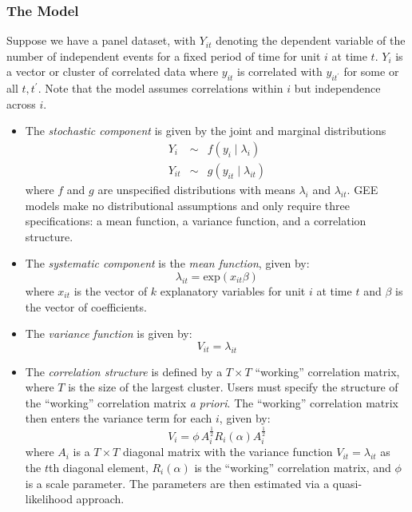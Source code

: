 \subsubsection{The Model}
Suppose we have a panel dataset, with $Y_{it}$ denoting the dependent variable of the number of independent events for a fixed period of time for unit $i$ at time $t$.  $Y_{i}$ is a vector or cluster of correlated data
where $y_{it}$ is correlated with $y_{it^\prime}$ for some or all
$t, t^\prime$.  Note that the model assumes correlations within $i$ but independence across $i$.  

\begin{itemize}

\item The \emph{stochastic component} is given by the joint and marginal distributions
\begin{eqnarray*}
Y_{i} &\sim& f(y_{i} \mid \lambda_{i})\\
Y_{it} &\sim& g(y_{it} \mid \lambda_{it})
\end{eqnarray*}
where $f$ and $g$ are unspecified distributions with means $\lambda_{i}$ and $\lambda_{it}$.  GEE models make no distributional assumptions and only require three specifications: a mean function, a variance function, and a correlation structure.

\item The \emph{systematic component} is the \textit{mean function}, given by:
\begin{equation*}
\lambda_{it}  = \mathrm{exp}(x_{it} \beta)
\end{equation*}
where $x_{it}$ is the vector of $k$ explanatory variables for unit $i$ at time $t$
and $\beta$ is the vector of coefficients.

\item The \textit{variance function} is given by: 
\begin{equation*}
V_{it} = \lambda_{it} 
\end{equation*} 

\item The \textit{correlation structure} is defined by a $T \times T$ ``working'' correlation matrix, where $T$ is the size of the largest cluster.  Users must specify the structure of the ``working'' correlation matrix \textit{a priori}.  The ``working'' correlation matrix then enters the variance term for each $i$, given by:
\begin{equation*}
V_{i} = \phi \, A_{i}^{\frac{1}{2}} R_{i}(\alpha) A_{i}^{\frac{1}{2}}
\end{equation*}
where $A_{i}$ is a $T \times T$ diagonal matrix with the variance function $V_{it} = \lambda_{it}$ as the $t$th diagonal element, $R_{i}(\alpha)$ is the ``working'' correlation matrix, and $\phi$ is a scale parameter.  The parameters are then estimated via a quasi-likelihood approach.


\end{itemize}
